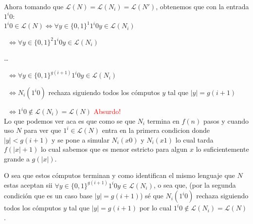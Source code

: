\documentclass{article}
\begin{document}
\begin{flushleft}
  Ahora tomando que $\mathcal{L}(N) = \mathcal{L}(N_i) = \mathcal{L}(N')$, obtenemos que con la entrada $1^i 0$:
  \\[0.5em]

  $1^i 0 \in \mathcal{L}(N) \iff \forall y \in \{0,1\}^1 1^i 0 y \in \mathcal{L}(N_i)$

  \qquad \qquad \quad \ $\iff \forall y \in \{0,1\}^2 1^i 0 y \in \mathcal{L}(N_i)$

  \qquad \qquad \qquad \dots

  \qquad \qquad \quad \ $\iff \forall y \in \{0,1\}^{g(i+1)} 1^i 0 y \in \mathcal{L}(N_i)$

  \qquad \qquad \quad \ $\iff N_i(1^i0)$ rechaza siguiendo todos los cómputos $y$ tal que $|y| = g(i+1)$

  \qquad \qquad \quad \ $\iff 1^i0 \not\in \mathcal{L}(N_i) = \mathcal{L}(N)$ \qquad \textcolor{Red}{Absurdo!}
  \\[0.5em]

  Lo que podemos ver aca es que como se que $N_i$ termina en $f(n)$ pasos y cuando uso $N$ para ver que $1^i \in
  \mathcal{L}(N)$ entra en la primera condicion donde $|y| < g(i+1)$ y se pone a simular $N_i(x0)$ y $ N_i(x1)$
  lo cual tarda $f(|x| + 1)$ lo cual sabemos que es menor estricto para algun $x$ lo suficientemente grande a 
  $g(|x|)$. 
  
  O sea que estos cómputos terminan y como identifican el mismo lenguaje que $N$ estas aceptan sii 
  $\forall y \in \{0,1\}^{g(i+1)} 1^i 0 y \in \mathcal{L}(N_i)$, o sea que, (por la segunda condición que es un caso
  base $|y| = g(i+1)$) sé que $N_i(1^i0)$ rechaza siguiendo todos los cómputos $y$ tal que $|y| = g(i+1)$ por lo cual
  $1^i0 \not\in \mathcal{L}(N_i) = \mathcal{L}(N)$.
\end{flushleft}
\end{document}
